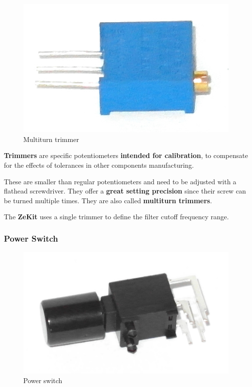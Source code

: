 \documentclass{scrartcl}
\begin{document}
\begin{figure}[!ht]
    \begin{center}
        \includegraphics[scale=0.20]{assets/zekit-trimmer.jpg}
        \caption{Multiturn trimmer}
    \end{center}
\end{figure}

\textbf{Trimmers} are specific potentiometers \textbf{intended for calibration}, to compensate for the effects of tolerances in other components manufacturing.

These are smaller than regular potentiometers and need to be adjusted with a flathead screwdriver. They offer a \textbf{great setting precision} since their screw can be turned multiple times. They are also called \textbf{multiturn trimmers}.

The \textbf{ZeKit} uses a single trimmer to define the filter cutoff frequency range.

\subsubsection{Power Switch}

\begin{figure}[!ht]
    \begin{center}
        \includegraphics[scale=0.18]{assets/zekit-power.jpg}
        \caption{Power switch}
    \end{center}
\end{figure}
\end{document}
